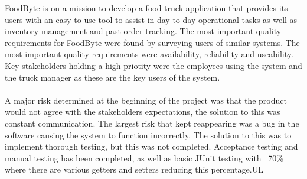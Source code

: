 FoodByte is on a mission to develop a food truck application that provides its users with an easy to use tool to assist in day to day operational tasks as well as inventory management and past order tracking. The most important quality requirements for FoodByte were found by surveying users of similar systems. The most important quality requirements were availability, reliability and useability. Key stakeholders holding a high priotity were the employees using the system and the truck manager as these are the key users of the system.
\\ \\
\noindent A major risk determined at the beginning of the project was that the product would not agree with the stakeholders expectations, the solution to this was constant communication. The largest risk that kept reappearing was a bug in the software causing the system to function incorrectly. The solution to this was to implement thorough testing, but this was not completed. Acceptance testing and manual testing has been completed, as well as basic JUnit testing with ~70\% where there are various getters and setters reducing this percentage.UL